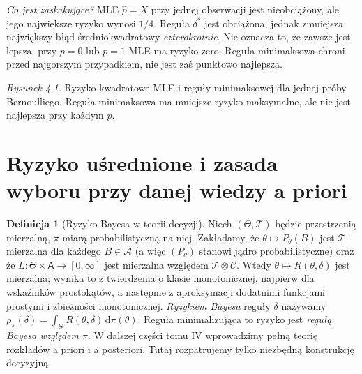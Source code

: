 \documentclass[11pt,a4paper,oneside]{report}
\numberwithin{equation}{chapter}
\theoremstyle{plain}
\theoremstyle{definition}
\newtheorem{definicja}{Definicja}[chapter]
\theoremstyle{remark}
\newcommand{\calA}{\mathcal A}
\newcommand{\dd}{\mathrm d}
\begin{document}
\emph{Co jest zaskakujące?} MLE $\widehat p=X$ przy jednej obserwacji
jest nieobciążony, ale jego największe ryzyko wynosi $1/4$.
Reguła $\delta^*$ jest obciążona, jednak zmniejsza największy błąd
średniokwadratowy \emph{czterokrotnie}. Nie oznacza to, że zawsze jest
lepsza: przy $p=0$ lub $p=1$ MLE ma ryzyko zero. Reguła minimaksowa
chroni przed najgorszym przypadkiem, nie jest zaś punktowo najlepsza.

\begin{center}
\end{center}
\noindent\emph{Rysunek 4.1.} Ryzyko kwadratowe MLE i reguły
minimaksowej dla jednej próby Bernoulliego. Reguła minimaksowa ma
mniejsze ryzyko maksymalne, ale nie jest najlepsza przy każdym $p$.


\section{Ryzyko uśrednione i zasada wyboru przy danej wiedzy a priori}
\begin{definicja}[Ryzyko Bayesa w teorii decyzji]\label{def:bayes-risk}
Niech $(\Theta,\mathcal T)$ będzie przestrzenią mierzalną,
$\pi$ miarą probabilistyczną na niej. Zakładamy, że
$\theta\mapsto P_\theta(B)$ jest $\mathcal T$-mierzalna dla
każdego $B\in\calA$ (a więc $(P_\theta)$ stanowi jądro
probabilistyczne) oraz że $L:\Theta\times\mathsf A\to[0,\infty]$
jest mierzalna względem $\mathcal T\otimes\mathcal C$.
Wtedy $\theta\mapsto R(\theta,\delta)$ jest mierzalna;
wynika to z twierdzenia o klasie monotonicznej, najpierw dla
wskaźników prostokątów, a następnie z aproksymacji dodatnimi
funkcjami prostymi i zbieżności monotonicznej.
\emph{Ryzykiem Bayesa} reguły $\delta$ nazywamy
$\rho_\pi(\delta)=\int_\Theta R(\theta,\delta)\,\dd\pi(\theta)$.
Reguła minimalizująca to ryzyko jest \emph{regułą Bayesa względem $\pi$}.
W dalszej części tomu IV wprowadzimy pełną teorię rozkładów
a priori i a posteriori. Tutaj rozpatrujemy tylko niezbędną
konstrukcję decyzyjną.
\end{definicja}
\end{document}
